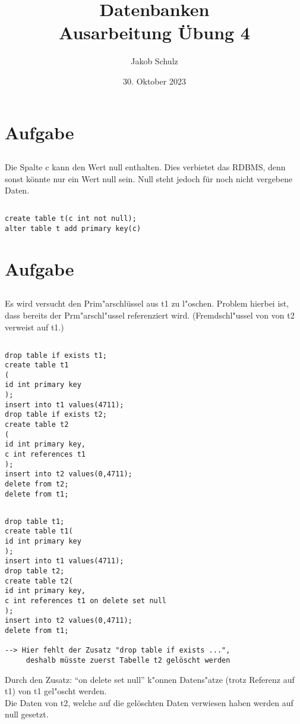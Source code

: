 \documentclass[a4paper, 11pt, titlepage]{article}
\begin{document}
\title{Datenbanken \\
Ausarbeitung \"Ubung 4}

\author{Jakob Schulz}

\date{30. Oktober 2023}

\maketitle{\thispagestyle{plain}}

\section{Aufgabe}

\subsection{}
Die Spalte c kann den Wert null enthalten. Dies verbietet das RDBMS, denn sonst könnte nur ein Wert null sein. Null steht jedoch für noch nicht vergebene Daten.
\subsection{}
\begin{verbatim}
create table t(c int not null);
alter table t add primary key(c)
\end{verbatim}
\section{Aufgabe}
\subsection{}
Es wird versucht den Prim"arschlüssel aus t1 zu l"oschen. Problem hierbei ist, dass bereits der Prm"arschl"ussel referenziert wird. (Fremdschl"ussel von von t2 verweist auf t1.)
\subsection{}
\begin{verbatim}
drop table if exists t1;
create table t1
(
id int primary key
);
insert into t1 values(4711);
drop table if exists t2;
create table t2
(
id int primary key,
c int references t1
);
insert into t2 values(0,4711);
delete from t2;
delete from t1; 
\end{verbatim}
\subsection{}
\begin{verbatim}
drop table t1;
create table t1(
id int primary key
);
insert into t1 values(4711);
drop table t2;
create table t2(
id int primary key,
c int references t1 on delete set null
);
insert into t2 values(0,4711);
delete from t1;

--> Hier fehlt der Zusatz "drop table if exists ...", 
     deshalb müsste zuerst Tabelle t2 gelöscht werden
\end{verbatim}
Durch den Zusatz: "`on delete set null"' k"onnen Datens"atze (trotz Referenz auf t1) von t1 gel"oscht werden. \\
Die Daten von t2, welche auf die gelöschten Daten verwiesen haben werden auf null gesetzt.
\end{document}
